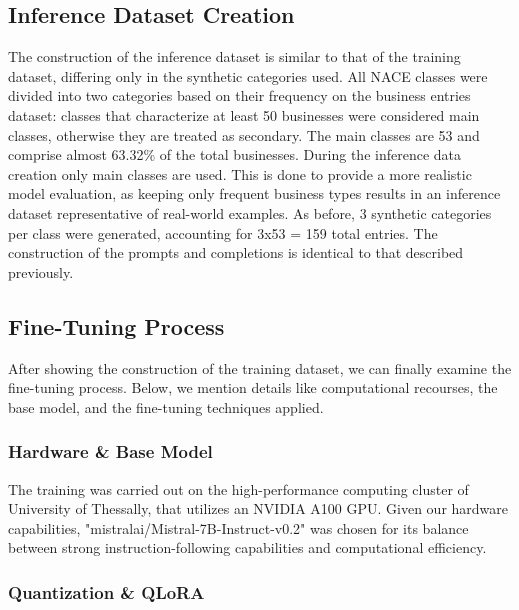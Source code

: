 \subsection{Inference Dataset Creation}
\label{sec:inference_dataset}

The construction of the inference dataset is similar to that of the training dataset, differing only in the synthetic categories used. Αll NACE classes were divided into two categories based on their frequency on the business entries dataset: classes that characterize at least 50 businesses were considered main classes, otherwise they are treated as secondary. The main classes are 53 and comprise almost 63.32\% of the total businesses. During the inference data creation only main classes are used. This is done to provide a more realistic model evaluation, as keeping only frequent business types results in an inference dataset representative of real-world examples. As before, 3 synthetic categories per class were generated, accounting for 3x53 = 159 total entries. The construction of the prompts and completions is identical to that described previously.


\subsection{Fine-Tuning Process}

After showing the construction of the training dataset, we can finally examine the fine-tuning process. Below, we mention details like computational recourses, the base model, and the fine-tuning techniques applied.


\subsubsection{Hardware \& Base Model}

The training was carried out on the high-performance computing cluster of University of Thessally, that utilizes an NVIDIA A100 GPU. Given our hardware capabilities, "mistralai/Mistral-7B-Instruct-v0.2" was chosen for its balance between strong instruction-following capabilities and computational efficiency. 

\subsubsection{Quantization \& QLoRA}

